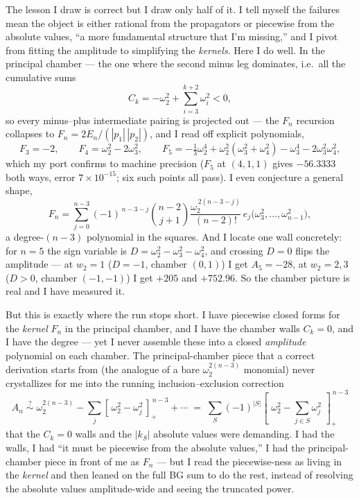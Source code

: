 \documentclass{article}
\newcommand{\pp}[1]{\left[\,#1\,\right]_{+}}
\begin{document}
The lesson I draw is correct but I draw only half of it. I tell myself the failures
mean the object is either rational from the propagators or piecewise from the
absolute values, ``a more fundamental structure that I'm missing,'' and I pivot
from fitting the amplitude to simplifying the \emph{kernels}. Here I do well. In the
principal chamber --- the one where the second minus leg dominates, i.e.\ all the
cumulative sums
\[
C_k=-\omega_2^2+\sum_{i=3}^{k+2}\omega_i^2<0,
\]
so every minus--plus intermediate pairing is projected out --- the $F_n$ recursion
collapses to $F_n=2E_n/(|p_1|\,|p_2|)$, and I read off explicit polynomials,
\[
F_3=-2,\qquad F_4=\omega_2^2-2\omega_3^2,\qquad
F_5=-\tfrac13\omega_2^4+\omega_2^2(\omega_3^2+\omega_4^2)-\omega_3^4-2\omega_3^2\omega_4^2,
\]
which my port confirms to machine precision ($F_5$ at $(4,1,1)$ gives
$-56.3333$ both ways, error $7\times10^{-15}$; six such points all pass). I even
conjecture a general shape,
\[
F_n=\sum_{j=0}^{n-3}(-1)^{\,n-3-j}\binom{n-2}{j+1}
\frac{\omega_2^{\,2(n-3-j)}}{(n-2)!}\,e_j\!\big(\omega_3^2,\dots,\omega_{n-1}^2\big),
\]
a degree-$(n-3)$ polynomial in the squares. And I locate one wall concretely: for
$n=5$ the sign variable is $D=\omega_2^2-\omega_3^2-\omega_4^2$, and crossing $D=0$
flips the amplitude --- at $w_2=1$ ($D=-1$, chamber $(0,1)$) I get $A_5=-28$, at
$w_2=2,3$ ($D>0$, chamber $(-1,-1)$) I get $+205$ and $+752.96$. So the chamber
picture is real and I have measured it.

But this is exactly where the run stops short. I have piecewise closed forms for
the \emph{kernel} $F_n$ in the principal chamber, and I have the chamber walls
$C_k=0$, and I have the degree --- yet I never assemble these into a closed
\emph{amplitude} polynomial on each chamber. The principal-chamber piece that a
correct derivation starts from (the analogue of a bare $\omega_2^{2(n-3)}$
monomial) never crystallizes for me into the running inclusion--exclusion
correction
\[
A_n \;\stackrel{?}{\sim}\; \omega_2^{2(n-3)}-\sum_j\pp{\omega_2^2-\omega_j^2}^{\,n-3}+\cdots
\;=\;\sum_{S}(-1)^{|S|}\pp{\,\omega_2^2-\textstyle\sum_{j\in S}\omega_j^2\,}^{\,n-3}
\]
that the $C_k=0$ walls and the $|k_S|$ absolute values were demanding. I had the
walls, I had ``it must be piecewise from the absolute values,'' I had the
principal-chamber piece in front of me as $F_n$ --- but I read the piecewise-ness
as living in the \emph{kernel} and then leaned on the full BG sum to do the rest,
instead of resolving the absolute values amplitude-wide and seeing the truncated
power.
\end{document}
